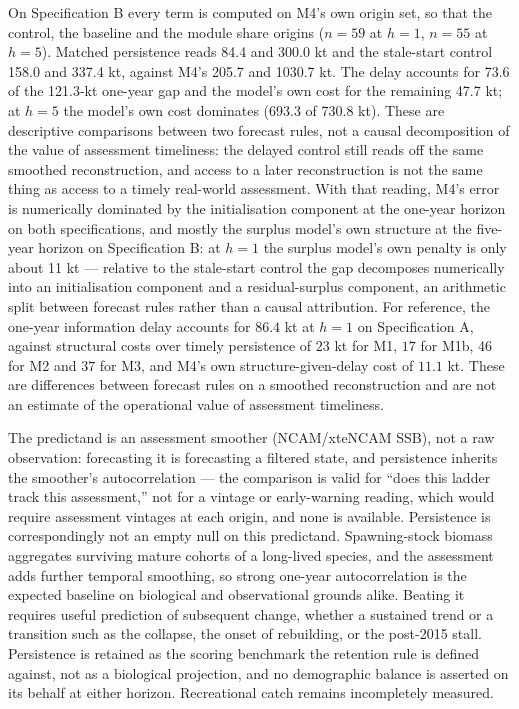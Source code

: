 \documentclass[11pt]{article}
\begin{document}
On Specification B every term is computed on M4's own origin set, so
that the control, the baseline and the module share origins (\(n=59\)
at \(h=1\), \(n=55\) at \(h=5\)). Matched persistence reads 84.4 and
300.0 kt and the stale-start control 158.0 and 337.4 kt, against M4's
205.7 and 1030.7 kt. The delay accounts for 73.6 of the 121.3-kt
one-year gap and the model's own cost for the remaining 47.7 kt; at
\(h = 5\) the model's own cost dominates (693.3 of 730.8 kt). These are descriptive comparisons between two
forecast rules, not a causal decomposition of the value of assessment
timeliness: the delayed control still reads off the same smoothed
reconstruction, and access to a later reconstruction is not the same
thing as access to a timely real-world assessment. With that reading,
M4's error is numerically dominated by the initialisation component at the
one-year horizon on both specifications, and mostly the surplus model's own structure at the
five-year horizon on Specification B: at \(h = 1\) the surplus model's
own penalty is only about 11 kt --- relative to the stale-start control the gap decomposes numerically into
an initialisation component and a residual-surplus component, an
arithmetic split between forecast rules rather than a causal
attribution. For reference, the one-year information delay accounts for \(86.4\) kt
at \(h = 1\) on Specification A, against structural costs over timely
persistence of \(23\) kt for M1, \(17\) for M1b, \(46\) for M2 and
\(37\) for M3, and M4's own structure-given-delay cost of \(11.1\) kt.
These are differences between forecast rules on a smoothed
reconstruction and are not an estimate of the operational value of
assessment timeliness.

The predictand is an assessment smoother (NCAM/xteNCAM SSB), not a raw
observation: forecasting it is forecasting a filtered state, and
persistence inherits the smoother's autocorrelation --- the comparison
is valid for ``does this ladder track this assessment,'' not for a
vintage or early-warning reading, which would require assessment
vintages at each origin, and none is available. Persistence is
correspondingly not an empty null on this predictand. Spawning-stock
biomass aggregates surviving mature cohorts of a long-lived species, and
the assessment adds further temporal smoothing, so strong one-year
autocorrelation is the expected baseline on biological and observational
grounds alike. Beating it requires useful prediction of subsequent change, whether a
sustained trend or a transition such as the collapse, the onset of
rebuilding, or the post-2015 stall. Persistence is retained as the scoring benchmark the retention rule is
defined against, not as a biological projection, and no demographic
balance is asserted on its behalf at either horizon.
Recreational catch remains incompletely measured.
\end{document}
